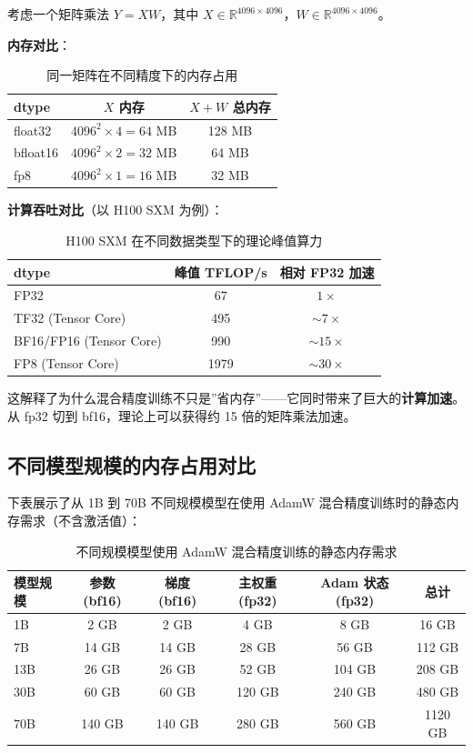 考虑一个矩阵乘法 $Y = XW$，其中 $X \in \mathbb{R}^{4096 \times 4096}$，$W \in \mathbb{R}^{4096 \times 4096}$。

\textbf{内存对比}：
\begin{table}[H]
\centering
\begin{tabular}{lcc}
\toprule
\textbf{dtype} & \textbf{$X$ 内存} & \textbf{$X + W$ 总内存} \\
\midrule
float32 & $4096^2 \times 4 = 64$ MB & 128 MB \\
bfloat16 & $4096^2 \times 2 = 32$ MB & 64 MB \\
fp8 & $4096^2 \times 1 = 16$ MB & 32 MB \\
\bottomrule
\end{tabular}
\caption{同一矩阵在不同精度下的内存占用}
\end{table}

\textbf{计算吞吐对比}（以 H100 SXM 为例）：
\begin{table}[H]
\centering
\begin{tabular}{lcc}
\toprule
\textbf{dtype} & \textbf{峰值 TFLOP/s} & \textbf{相对 FP32 加速} \\
\midrule
FP32 & 67 & $1\times$ \\
TF32 (Tensor Core) & 495 & $\sim 7\times$ \\
BF16/FP16 (Tensor Core) & 990 & $\sim 15\times$ \\
FP8 (Tensor Core) & 1979 & $\sim 30\times$ \\
\bottomrule
\end{tabular}
\caption{H100 SXM 在不同数据类型下的理论峰值算力}
\end{table}

这解释了为什么混合精度训练不只是”省内存”——它同时带来了巨大的\textbf{计算加速}。从 fp32 切到 bf16，理论上可以获得约 15 倍的矩阵乘法加速。

\subsection{不同模型规模的内存占用对比}

下表展示了从 1B 到 70B 不同规模模型在使用 AdamW 混合精度训练时的静态内存需求（不含激活值）：

\begin{table}[H]
\centering
\begin{tabular}{lccccc}
\toprule
\textbf{模型规模} & \textbf{参数 (bf16)} & \textbf{梯度 (bf16)} & \textbf{主权重 (fp32)} & \textbf{Adam 状态 (fp32)} & \textbf{总计} \\
\midrule
1B & 2 GB & 2 GB & 4 GB & 8 GB & 16 GB \\
7B & 14 GB & 14 GB & 28 GB & 56 GB & 112 GB \\
13B & 26 GB & 26 GB & 52 GB & 104 GB & 208 GB \\
30B & 60 GB & 60 GB & 120 GB & 240 GB & 480 GB \\
70B & 140 GB & 140 GB & 280 GB & 560 GB & 1120 GB \\
\bottomrule
\end{tabular}
\caption{不同规模模型使用 AdamW 混合精度训练的静态内存需求}
\end{table}

